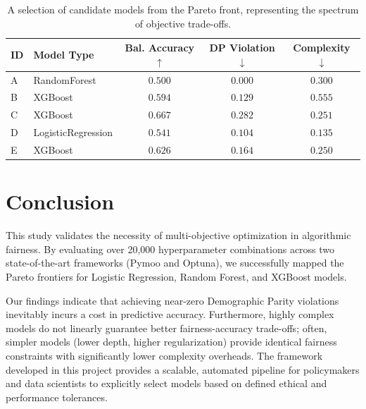 \documentclass[12pt, a4paper]{article}
\begin{document}
\begin{table}[H]
\centering
\begin{tabular}{llccc}
\toprule
\textbf{ID} & \textbf{Model Type} & \textbf{Bal. Accuracy} $\uparrow$ & \textbf{DP Violation} $\downarrow$ & \textbf{Complexity} $\downarrow$ \\
\midrule
A & RandomForest & $0.500$ & $0.000$ & $0.300$ \\
B & XGBoost & $0.594$ & $0.129$ & $0.555$ \\
C & XGBoost & $0.667$ & $0.282$ & $0.251$ \\
D & LogisticRegression & $0.541$ & $0.104$ & $0.135$ \\
E & XGBoost & $0.626$ & $0.164$ & $0.250$ \\
\bottomrule
\end{tabular}
\caption{A selection of candidate models from the Pareto front, representing the spectrum of objective trade-offs.}
\label{tab:pareto_points}
\end{table}

\section{Conclusion}
This study validates the necessity of multi-objective optimization in algorithmic fairness. By evaluating over 20,000 hyperparameter combinations across two state-of-the-art frameworks (Pymoo and Optuna), we successfully mapped the Pareto frontiers for Logistic Regression, Random Forest, and XGBoost models. 

Our findings indicate that achieving near-zero Demographic Parity violations inevitably incurs a cost in predictive accuracy. Furthermore, highly complex models do not linearly guarantee better fairness-accuracy trade-offs; often, simpler models (lower depth, higher regularization) provide identical fairness constraints with significantly lower complexity overheads. The framework developed in this project provides a scalable, automated pipeline for policymakers and data scientists to explicitly select models based on defined ethical and performance tolerances.
\end{document}
